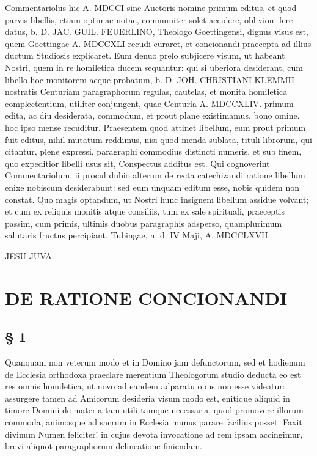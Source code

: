 Commentariolus hic A. MDCCI sine Auctoris nomine primum editus, et quod parvis libellis, etiam optimae notae, communiter solet accidere, oblivioni fere datus, b. D. JAC. GUIL. FEUERLINO, Theologo Goettingensi, dignus visus est, quem Goettingae A. MDCCXLI recudi curaret, et concionandi praecepta ad illius ductum Studiosis explicaret. Eum denuo prelo subjicere visum, ut habeant Nostri, quem in re homiletica ducem sequantur: qui si uberiora desiderant, cum libello hoc monitorem aeque probatum, b. D. JOH. CHRISTIANI KLEMMII nostratis Centuriam paragraphorum regulas, cautelas, et monita homiletica complectentium, utiliter conjungent, quae Centuria A. MDCCXLIV. primum edita, ac diu desiderata, commodum, et prout plane existimamus, bono omine, hoc ipso mense recuditur. Praesentem quod attinet libellum, eum prout primum fuit editus, nihil mutatum reddimus, nisi quod menda sublata, tituli librorum, qui citantur, plene expressi, paragraphi commodius distincti numeris, et sub finem, quo expeditior libelli usus sit, Conspectus additus est. Qui cognoverint Commentariolum, ii procul dubio alterum de recta catechizandi ratione libellum enixe nobiscum desiderabunt: sed eum unquam editum esse, nobis quidem non constat. Quo magis optandum, ut Nostri hunc insignem libellum assidue volvant; et cum ex reliquis monitis atque consiliis, tum ex sale spirituali, praeceptis passim, cum primis, ultimis duobus paragraphis adsperso, quamplurimum salutaris fructus percipiant. Tubingae, a. d. IV Maji, A. MDCCLXVII.

\begin{center}
JESU JUVA.
\end{center}

\section{DE RATIONE CONCIONANDI}

\subsection{§ 1}

Quanquam non veterum modo et in Domino jam defunctorum, sed et hodienum de Ecclesia orthodoxa praeclare merentium Theologorum studio deducta eo est res omnis homiletica, ut novo ad eandem adparatu opus non esse videatur: assurgere tamen ad Amicorum desideria visum modo est, enitique aliquid in timore Domini de materia tam utili tamque necessaria, quod promovere illorum commoda, animosque ad sacrum in Ecclesia munus parare facilius posset. Faxit divinum Numen feliciter! in cujus devota invocatione ad rem ipsam accingimur, brevi aliquot paragraphorum delineatione finiendam.

